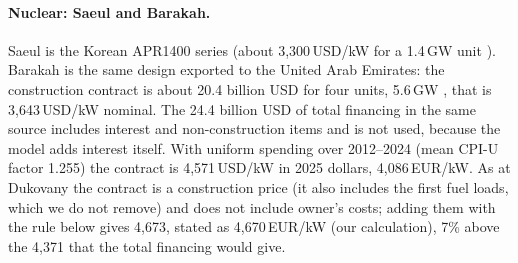 \paragraph{Nuclear: Saeul and Barakah.} Saeul is the Korean APR1400 series (about 3{,}300\,USD/kW for a 1.4\,GW unit \citep{HSF2026,KHNP2025}). Barakah is the same design exported to the United Arab Emirates: the construction contract is about 20.4 billion USD for four units, 5.6\,GW \citep{WNAuae}, that is 3{,}643\,USD/kW nominal. The 24.4 billion USD of total financing in the same source includes interest and non-construction items and is not used, because the model adds interest itself. With uniform spending over 2012--2024 (mean CPI-U factor 1.255) the contract is 4{,}571\,USD/kW in 2025 dollars, 4{,}086\,EUR/kW. As at Dukovany the contract is a construction price (it also includes the first fuel loads, which we do not remove) and does not include owner's costs; adding them with the rule below gives 4{,}673, stated as 4{,}670\,EUR/kW (our calculation), 7\% above the 4{,}371 that the total financing would give.

